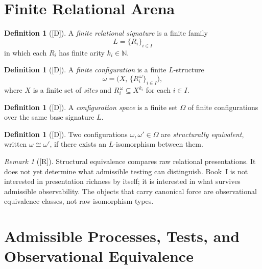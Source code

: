 \documentclass[12pt,oneside]{amsbook}
\theoremstyle{plain}
\theoremstyle{definition}
\newtheorem{definition}[theorem]{Definition}
\theoremstyle{remark}
\newtheorem{remark}[theorem]{Remark}
\newcommand{\status}[1]{\textup{[#1]}}
\begin{document}
\section{Finite Relational Arena}

\begin{definition}[\status{D}]\label{def:signature}
A \emph{finite relational signature} is a finite family
\[
  L = \{R_i\}_{i \in I}
\]
in which each $R_i$ has finite arity $k_i \in \mathbb{N}$.
\end{definition}

\begin{definition}[\status{D}]\label{def:config}
A \emph{finite configuration} is a finite $L$-structure
\[
  \omega = \bigl(X,\, \{R_i^{\,\omega}\}_{i \in I}\bigr),
\]
where $X$ is a finite set of \emph{sites} and
$R_i^{\,\omega} \subseteq X^{k_i}$ for each $i \in I$.
\end{definition}

\begin{definition}[\status{D}]\label{def:config-space}
A \emph{configuration space} is a finite set $\Omega$ of finite
configurations over the same base signature $L$.
\end{definition}

\begin{definition}[\status{D}]\label{def:struct-equiv}
Two configurations $\omega, \omega' \in \Omega$ are
\emph{structurally equivalent}, written $\omega \cong \omega'$, if
there exists an $L$-isomorphism between them.
\end{definition}

\begin{remark}[\status{R}]\label{rmk:struct-vs-obs}
Structural equivalence compares raw relational presentations.  It does
not yet determine what admissible testing can distinguish.  Book~I is
not interested in presentation richness by itself; it is interested in
what survives admissible observability.  The objects that carry
canonical force are observational equivalence classes, not raw
isomorphism types.
\end{remark}

\section{Admissible Processes, Tests, and Observational Equivalence}
\end{document}

